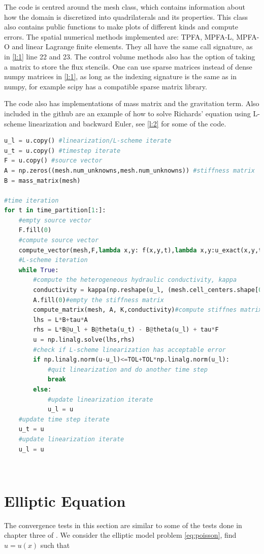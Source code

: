 \documentclass[../Main/main.tex]{subfiles}
\begin{document}
		The code is centred around the mesh class, which contains information about how the domain is discretized into quadrilaterals and its properties. This class also contains public functions to make plots of different kinds and compute errors. The spatial numerical methods implemented are: TPFA, MPFA-L, MPFA-O and linear Lagrange finite elements. They all have the same call signature, as in \ref{l:1} line 22 and 23. The control volume methods also has the option of taking a matrix to store the flux stencils. One can use sparse matrices instead of dense numpy matrices in \ref{l:1}, as long as the indexing signature is the same as in numpy, for example scipy has a compatible sparse matrix library.
		\par
		The code also has implementations of mass matrix and the gravitation term. Also included in the github are an example of how to solve Richards' equation using L-scheme linearization and backward Euler, see \ref{l:2} for some of the code.
		\begin{minipage}{1.1\linewidth}
			\centering
\begin{lstlisting}[language=Python,caption=Linearization and time stepping of Richards' equation.,label=l:2]
u_l = u.copy() #linearization/L-scheme iterate
u_t = u.copy() #timestep iterate
F = u.copy() #source vector
A = np.zeros((mesh.num_unknowns,mesh.num_unknowns)) #stiffness matrix
B = mass_matrix(mesh)

#time iteration
for t in time_partition[1:]:
	#empty source vector
	F.fill(0)
	#compute source vector
	compute_vector(mesh,F,lambda x,y: f(x,y,t),lambda x,y:u_exact(x,y,t))
	#L-scheme iteration
	while True:
		#compute the heterogeneous hydraulic conductivity, kappa
		conductivity = kappa(np.reshape(u_l, (mesh.cell_centers.shape[0],mesh.cell_centers.shape[1]),order='F'))
		A.fill(0)#empty the stiffness matrix
		compute_matrix(mesh, A, K,conductivity)#compute stiffnes matrix
		lhs = L*B+tau*A
		rhs = L*B@u_l + B@theta(u_t) - B@theta(u_l) + tau*F
		u = np.linalg.solve(lhs,rhs)
		#check if L-scheme linearization has acceptable error
		if np.linalg.norm(u-u_l)<=TOL+TOL*np.linalg.norm(u_l):
			#quit linearization and do another time step
			break
		else:
			#update linearization iterate
			u_l = u
	#update time step iterate		
	u_t = u
	#update linearization iterate
	u_l = u
\end{lstlisting}		\end{minipage}
		
		\
		\section{Elliptic Equation}
		\label{sec:elliptic_numerical}
		The convergence tests in this section are similar to some of the tests done in chapter three of \cite{https://doi.org/10.1002/num.20320}. We consider the elliptic model problem \eqref{eq:poisson}, find $u=u(x)$ such that
\end{document}
